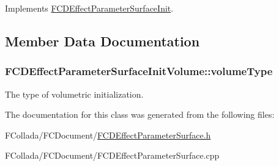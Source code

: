 Implements \hyperlink{classFCDEffectParameterSurfaceInit_ad0109233e63c892e5963a3ca67f7108f}{FCDEffectParameterSurfaceInit}.



\subsection{Member Data Documentation}
\hypertarget{classFCDEffectParameterSurfaceInitVolume_aad5bb8a564f3583dce34eb2b916d87e7}{
\subsubsection[{volumeType}]{ {\bf FCDEffectParameterSurfaceInitVolume::volumeType}}}
\label{classFCDEffectParameterSurfaceInitVolume_aad5bb8a564f3583dce34eb2b916d87e7}
The type of volumetric initialization. 

The documentation for this class was generated from the following files:\begin{DoxyCompactItemize}
\item 
FCollada/FCDocument/\hyperlink{FCDEffectParameterSurface_8h}{FCDEffectParameterSurface.h}\item 
FCollada/FCDocument/FCDEffectParameterSurface.cpp\end{DoxyCompactItemize}
